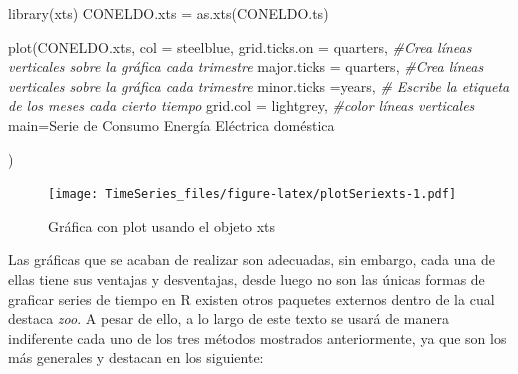 \documentclass[
  spanish,
]{book}
\newenvironment{Shaded}{\begin{snugshade}}{\end{snugshade}}
\newcommand{\AttributeTok}[1]{\textcolor[rgb]{0.77,0.63,0.00}{#1}}
\newcommand{\CommentTok}[1]{\textcolor[rgb]{0.56,0.35,0.01}{\textit{#1}}}
\newcommand{\FunctionTok}[1]{\textcolor[rgb]{0.00,0.00,0.00}{#1}}
\newcommand{\NormalTok}[1]{#1}
\newcommand{\OtherTok}[1]{\textcolor[rgb]{0.56,0.35,0.01}{#1}}
\newcommand{\StringTok}[1]{\textcolor[rgb]{0.31,0.60,0.02}{#1}}
\theoremstyle{remark}
\begin{document}
\begin{Shaded}
\begin{Highlighting}[]
\FunctionTok{library}\NormalTok{(xts)}
\NormalTok{CONELDO.xts }\OtherTok{=} \FunctionTok{as.xts}\NormalTok{(CONELDO.ts)}

\FunctionTok{plot}\NormalTok{(CONELDO.xts, }\AttributeTok{col =} \StringTok{\textquotesingle{}steelblue\textquotesingle{}}\NormalTok{, }
     \AttributeTok{grid.ticks.on =} \StringTok{\textquotesingle{}quarters\textquotesingle{}}\NormalTok{, }\CommentTok{\#Crea líneas verticales sobre la gráfica cada trimestre}
     \AttributeTok{major.ticks =} \StringTok{\textquotesingle{}quarters\textquotesingle{}}\NormalTok{,  }\CommentTok{\#Crea líneas verticales sobre la gráfica cada trimestre}
     \AttributeTok{minor.ticks =}\StringTok{\textquotesingle{}years\textquotesingle{}}\NormalTok{, }\CommentTok{\# Escribe la etiqueta de los meses cada cierto tiempo}
     \AttributeTok{grid.col =} \StringTok{\textquotesingle{}lightgrey\textquotesingle{}}\NormalTok{, }\CommentTok{\#color líneas verticales}
     \AttributeTok{main=}\StringTok{\textquotesingle{}Serie de Consumo Energía Eléctrica doméstica\textquotesingle{}}
     
\NormalTok{     )}
\end{Highlighting}
\end{Shaded}

\begin{figure}
\centering
\texttt{[image: TimeSeries\_files/figure-latex/plotSeriexts-1.pdf]}
\caption{\label{fig:plotSeriexts}Gráfica con plot usando el objeto xts}
\end{figure}

Las gráficas que se acaban de realizar son adecuadas, sin embargo, cada una de ellas tiene sus ventajas y desventajas, desde luego no son las únicas formas de graficar series de tiempo en R existen otros paquetes externos dentro de la cual destaca \emph{zoo}. A pesar de ello, a lo largo de este texto se usará de manera indiferente cada uno de los tres métodos mostrados anteriormente, ya que son los más generales y destacan en los siguiente:
\end{document}
